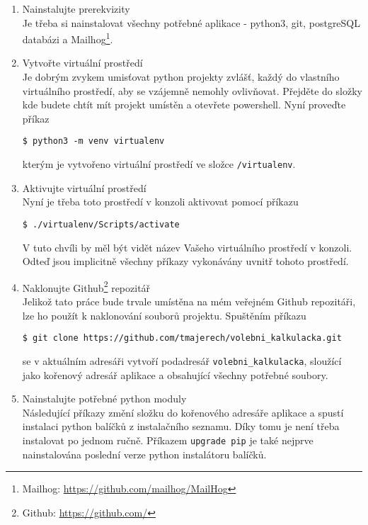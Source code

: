 \label{append:instalace-local}
\begin{enumerate}
    \item Nainstalujte prerekvizity\\
    Je třeba si nainstalovat všechny potřebné aplikace - python3, git, postgreSQL databázi a Mailhog\footnote{Mailhog: \url{https://github.com/mailhog/MailHog}}. 
    
    \item Vytvořte virtuální prostředí\\
    Je dobrým zvykem umisťovat python projekty zvlášť, každý do vlastního virtuálního prostředí, aby se vzájemně nemohly ovlivňovat. Přejděte do složky kde budete chtít mít projekt umístěn a otevřete powershell. Nyní proveďte příkaz
    
    \texttt{\$ python3 -m venv virtualenv}
    
    kterým je vytvořeno virtuální prostředí ve složce \texttt{/virtualenv}. 
    
    \item Aktivujte virtuální prostředí\\
    Nyní je třeba toto prostředí v konzoli aktivovat pomocí příkazu
    
    \texttt{\$ ./virtualenv/Scripts/activate}
    
    V tuto chvíli by měl být vidět název Vašeho virtuálního prostředí v konzoli. Odteď jsou implicitně všechny příkazy vykonávány uvnitř tohoto prostředí.
    
    \item Naklonujte Github\footnote{Github: \url{https://github.com/}} repozitář\\
    Jelikož tato práce bude trvale umístěna na mém veřejném Github repozitáři, lze ho použít k naklonování souborů projektu. Spuštěním příkazu 
    
    \texttt{\$ git clone https://github.com/tmajerech/volebni\_kalkulacka.git}
    
    se v aktuálním adresáři vytvoří podadresář \texttt{volebni\_kalkulacka}, sloužící jako kořenový adresář aplikace a obsahující všechny potřebné soubory.
    

    \item Nainstalujte potřebné python moduly\\
    Následující příkazy změní složku do kořenového adresáře aplikace a spustí instalaci python balíčků z instalačního seznamu. Díky tomu je není třeba instalovat po jednom ručně. Příkazem \texttt{upgrade pip} je také nejprve nainstalována poslední verze python instalátoru balíčků.


\end{enumerate}
